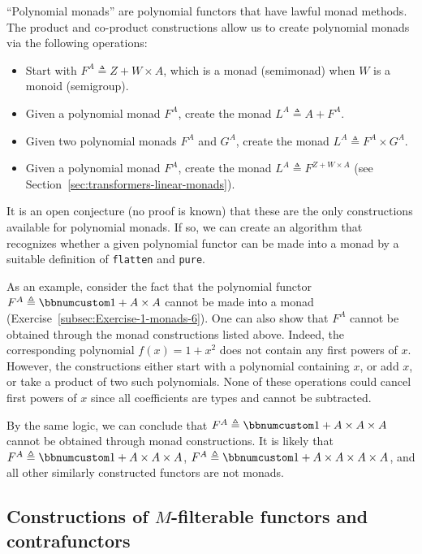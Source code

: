\textsf{``}Polynomial monads\textsf{''} are polynomial functors that have lawful monad
methods. The product and co-product constructions allow us to create
polynomial monads via the following operations:
\begin{itemize}
\item Start with $F^{A}\triangleq Z+W\times A$, which is a monad (semimonad)
when $W$ is a monoid (semigroup).
\item Given a polynomial monad $F^{A}$, create the monad $L^{A}\triangleq A+F^{A}$.
\item Given two polynomial monads $F^{A}$ and $G^{A}$, create the monad
$L^{A}\triangleq F^{A}\times G^{A}$.
\item Given a polynomial monad $F^{A}$, create the monad $L^{A}\triangleq F^{Z+W\times A}$
(see Section~\ref{sec:transformers-linear-monads}).
\end{itemize}
It is an open conjecture (no proof is known) that these are the only
constructions available for polynomial monads. If so, we can create
an algorithm that recognizes whether a given polynomial functor can
be made into a monad by a suitable definition of \lstinline!flatten!
and \lstinline!pure!. 

As an example, consider the fact that the polynomial functor $F^{A}\triangleq\bbnum 1+A\times A$
cannot be made into a monad (Exercise~\ref{subsec:Exercise-1-monads-6}).
One can also show that $F^{A}$ cannot be obtained through the monad
constructions listed above. Indeed, the corresponding polynomial $f(x)=1+x^{2}$
does not contain any first powers of $x$. However, the constructions
either start with a polynomial containing $x$, or add $x$, or take
a product of two such polynomials. None of these operations could
cancel first powers of $x$ since all coefficients are types and cannot
be subtracted.

By the same logic, we can conclude that $F^{A}\triangleq\bbnum 1+A\times A\times A$
cannot be obtained through monad constructions. It is likely that
$F^{A}\triangleq\bbnum 1+A\times A\times A$, $F^{A}\triangleq\bbnum 1+A\times A\times A\times A$,
and all other similarly constructed functors are not monads.

\subsection{Constructions of $M$-filterable functors and contrafunctors}

